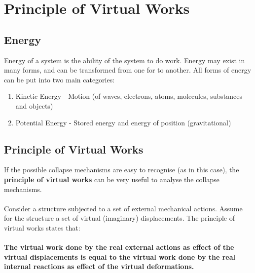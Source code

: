 \documentclass[class=report, crop=false, 12pt,a4paper]{standalone}
\begin{document}
\section{Principle of Virtual Works}
\subsection{Energy}
Energy of a system is the ability of the system to do work. Energy may exist in many forms, and can be transformed from one for to another. All forms of energy can be put into two main categories: 
\begin{enumerate}
  \item Kinetic Energy - Motion (of waves, electrons, atoms, molecules, substances and objects)
  \item Potential Energy - Stored energy and energy of position (gravitational)
\end{enumerate}
\subsection{Principle of Virtual Works}
If the possible collapse mechanisms are easy to recognise (as in this case), the \textbf{principle of virtual works} can be very useful to analyse the collapse mechanisms. \\\\
Consider a structure subjected to a set of external mechanical actions. Assume for the structure a set of virtual (imaginary) displacements. The principle of virtual works states that: \\\\
\textbf{The virtual work done by the real external actions as effect of the virtual displacements is equal to the virtual work done by the real internal reactions as effect of the virtual deformations.}
\end{document}
